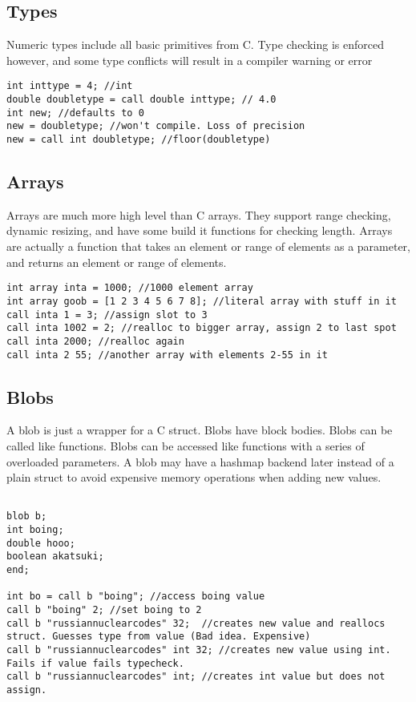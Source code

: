 \documentclass{article}
\begin{document}
\subsection{Types}
Numeric types include all basic primitives from C. Type checking is enforced however, and some type conflicts will result in a compiler warning or error
\begin{verbatim}
int inttype = 4; //int
double doubletype = call double inttype; // 4.0 
int new; //defaults to 0 
new = doubletype; //won't compile. Loss of precision
new = call int doubletype; //floor(doubletype) 
\end{verbatim}


\subsection{Arrays}
Arrays are much more high level than C arrays. They support range checking, dynamic resizing, and have some build it functions for checking length. Arrays are actually a function that takes an element or range of elements as a parameter, and returns an element or range of elements.  
\begin{verbatim}
int array inta = 1000; //1000 element array
int array goob = [1 2 3 4 5 6 7 8]; //literal array with stuff in it
call inta 1 = 3; //assign slot to 3
call inta 1002 = 2; //realloc to bigger array, assign 2 to last spot
call inta 2000; //realloc again
call inta 2 55; //another array with elements 2-55 in it
\end{verbatim}


\subsection{Blobs}
A blob is just a wrapper for a C struct. Blobs have block bodies. Blobs can be called like functions. Blobs can be accessed like functions with a series of overloaded parameters. A blob may have a hashmap backend later instead of a plain struct to avoid expensive memory operations when adding new values. 


\begin{verbatim}

blob b;
int boing;
double hooo;
boolean akatsuki;
end; 

int bo = call b "boing"; //access boing value
call b "boing" 2; //set boing to 2
call b "russiannuclearcodes" 32;  //creates new value and reallocs struct. Guesses type from value (Bad idea. Expensive)  
call b "russiannuclearcodes" int 32; //creates new value using int. Fails if value fails typecheck. 
call b "russiannuclearcodes" int; //creates int value but does not assign. 
\end{verbatim} 
\end{document}
